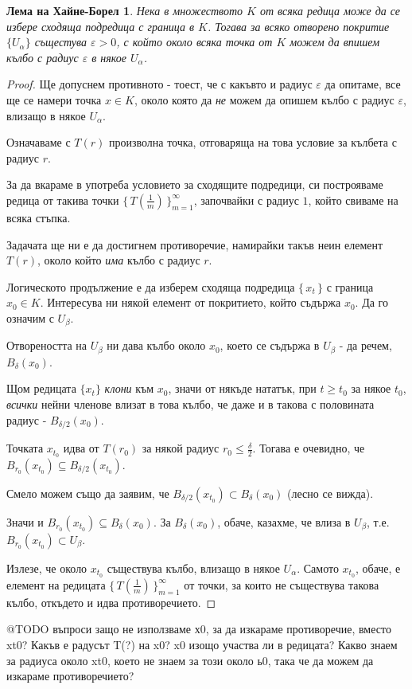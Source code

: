 \documentclass{article}
\newtheorem*{lemma-heine}{Лема на Хайне-Борел}
\theoremstyle{definition}
\begin{document}
\begin{lemma-heine}
    Нека в множеството  $K$ от всяка редица може да се избере сходяща подредица с граница в $K$.
    Тогава за всяко отворено покритие $\{U_\alpha\}$ същестува $\varepsilon > 0$,
    с който около всяка точка от $K$ можем да впишем кълбо с радиус $\varepsilon$ в някое $U_\alpha$.
\end{lemma-heine}

\begin{proof}
    Ще допуснем противното - тоест, че с какъвто и радиус $\varepsilon$ да опитаме,
    все ще се намери точка $x \in K$, около която да \textit{не} можем да опишем кълбо с радиус $\varepsilon$, влизащо в някое $U_\alpha$.

    Означаваме с $T(r)$ произволна точка, отговаряща на това условие за кълбета с радиус $r$.

    За да вкараме в употреба условието за сходящите подредици,
    си построяваме редица от такива точки $\{\,T(\frac{1}{m})\,\}_{m=1}^{\infty}$,
    започвайки с радиус $1$, който свиваме на всяка стъпка.

    Задачата ще ни е да достигнем противоречие, намирайки такъв неин елемент $T(r)$, около който \textit{има} кълбо с радиус $r$.

    Логическото продължение е да изберем сходяща подредица $\{\,x_t\,\}$ с граница $x_0 \in K$.
    Интересува ни някой елемент от покритието, който съдържа $x_0$.
    Да го означим с $U_\beta$.

    Отвореността на $U_\beta$ ни дава кълбо около $x_0$, което се съдържа в $U_\beta$ - да речем, $B_\delta(x_0)$.

    Щом редицата $\{ x_t \}$ \textit{клони} към $x_0$,
    значи от някъде нататък, при $t \ge t_0$ за някое $t_0$,
    \textit{всички} нейни членове влизат в това кълбо,
    че даже и в такова с половината радиус - $B_{\delta / 2}(x_0)$.

    Точката $x_{t_0}$ идва от $T(r_0)$ за някой радиус $r_0 \le \frac{\delta}{2}$. 
    Тогава е очевидно, че $B_{r_0}(x_{t_0}) \subseteq B_{\delta/2}(x_{t_0})$.

    Смело можем също да заявим, че $B_{\delta/2}(x_{t_0}) \subset B_\delta(x_0)$ (лесно се вижда). 

    Значи и $B_{r_0}(x_{t_0}) \subseteq B_\delta(x_0)$. За $B_\delta(x_0)$, обаче, казахме, че влиза в $U_\beta$, т.е. $B_{r_0}(x_{t_0}) \subset U_\beta$.

    Излезе, че около $x_{t_0}$ съществува кълбо, влизащо в някое $U_\alpha$. Самото $x_{t_0}$, обаче, е елемент на редицата $\{\,T(\frac{1}{m})\,\}_{m=1}^{\infty}$ от точки, за които не съществува такова кълбо, откъдето и идва противоречието.
\end{proof}

@TODO въпроси
защо не използваме х0, за да изкараме противоречие, вместо xt0? Какъв е радусът T(?) на x0? x0 изощо участва ли в редицата? Какво знаем за радиуса около xt0, което не знаем за този около ь0, така че да можем да изкараме противоречието?
\end{document}
